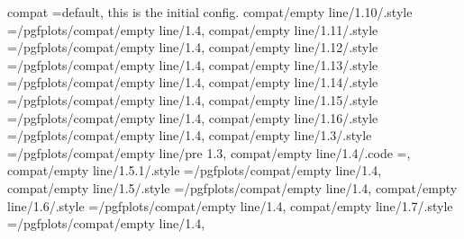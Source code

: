 {{{{{{{{compat                                                             =default, this is the initial config.                                                                                              
compat/empty line/1.10/.style                                      ={/pgfplots/compat/empty line/1.4},                                                                                                
compat/empty line/1.11/.style                                      ={/pgfplots/compat/empty line/1.4},                                                                                                
compat/empty line/1.12/.style                                      ={/pgfplots/compat/empty line/1.4},                                                                                                
compat/empty line/1.13/.style                                      ={/pgfplots/compat/empty line/1.4},                                                                                                
compat/empty line/1.14/.style                                      ={/pgfplots/compat/empty line/1.4},                                                                                                
compat/empty line/1.15/.style                                      ={/pgfplots/compat/empty line/1.4},                                                                                                
compat/empty line/1.16/.style                                      ={/pgfplots/compat/empty line/1.4},                                                                                                
compat/empty line/1.3/.style                                       ={/pgfplots/compat/empty line/pre 1.3},                                                                                            
compat/empty line/1.4/.code                                        ={\pgfplots@emptyline@compatfalse},                                                                                                
compat/empty line/1.5.1/.style                                     ={/pgfplots/compat/empty line/1.4},                                                                                                
compat/empty line/1.5/.style                                       ={/pgfplots/compat/empty line/1.4},                                                                                                
compat/empty line/1.6/.style                                       ={/pgfplots/compat/empty line/1.4},                                                                                                
compat/empty line/1.7/.style                                       ={/pgfplots/compat/empty line/1.4},                                                                                                
}}}}}}}}
